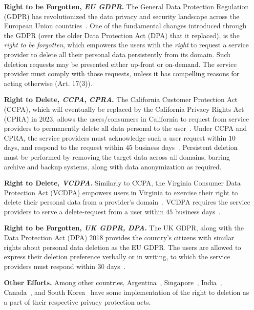 \documentclass[11pt,dvipdfmx]{article}
\newcommand\Paragraph[1]{\vspace{0.02in}  \noindent \textbf{#1.}}
\begin{document}
\Paragraph{Right to be Forgotten, \textit{EU GDPR}}
The General Data Protection Regulation (GDPR) has revolutionized the data privacy and security landscape across the European Union countries~\cite{GDPR}. 
One of the fundamental changes introduced through the GDPR (over the older Data Protection Act (DPA) that it replaced), is the \textit{right to be forgotten}, which empowers the users with the \emph{right} to request a service provider to delete all their personal data persistently from its domain. 
Such deletion requests may be presented either up-front or on-demand. 
The service provider must comply with those requests, unless it has compelling reasons for acting otherwise (Art. 17(3)). 


\Paragraph{Right to Delete, \textit{CCPA}, \textit{CPRA}}
The California Customer Protection Act (CCPA), which will eventually be replaced by the California Privacy Rights Act (CPRA) in 2023, allows the users/consumers in California to request from service providers to permanently delete all data personal to the user~\cite{CCPA2018,CPRA}. 
Under CCPA and CPRA, the service providers must acknowledge such a user request within $10$ days, and respond to the request within $45$ business days~\cite{Brown2021}. 
Persistent deletion must be performed by removing the target data across all domains, barring archive and backup systems, along with data anonymization as required. 

\Paragraph{Right to Delete, \textit{VCDPA}}
Similarly to CCPA, the Virginia Consumer Data Protection Act (VCDPA) empowers users in Virginia to exercise their right to delete their personal data from a provider's domain~\cite{VCPDA}. 
VCDPA requires the service providers to serve a delete-request from a user within $45$ business days~\cite{Brown2021}. 


\Paragraph{Right to be Forgotten, \textit{UK GDPR, DPA}} 
The UK GDPR, along with the Data Protection Act (DPA) 2018 provides the country's citizens with similar rights about personal data deletion as the EU GDPR. 
The users are allowed to express their deletion preference verbally or in writing, to which the service providers must respond within $30$ days~\cite{UKGDPR,DPA2018}. 



\Paragraph{Other Efforts}  
Among other countries, Argentina~\cite{Carter2013,Pardo2020}, Singapore~\cite{Chik2013}, India~\cite{Kittane2021}, Canada~\cite{PIPEDA2019}, and South Korea~\cite{Brown2016} have some implementation of the right to deletion as a part of their respective privacy protection acts.
\end{document}
